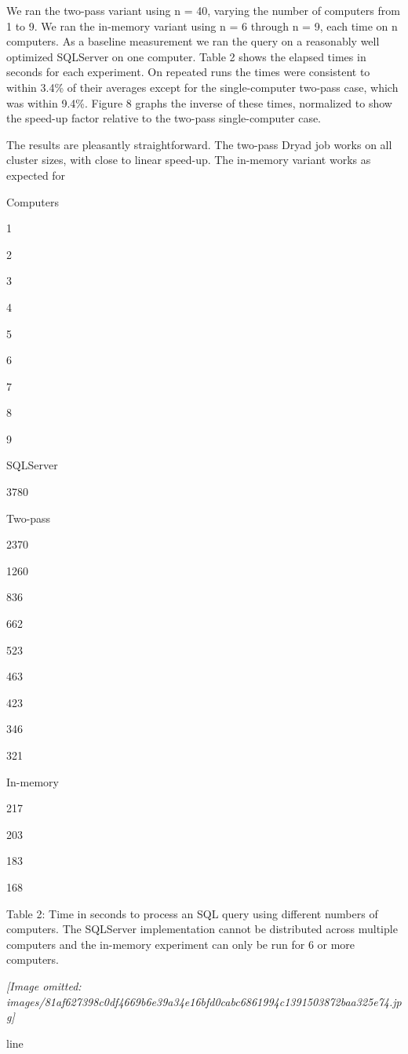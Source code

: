 \documentclass[
]{article}
\begin{document}
We ran the two-pass variant using n = 40, varying the number of
computers from 1 to 9. We ran the in-memory variant using n = 6 through
n = 9, each time on n computers. As a baseline measurement we ran the
query on a reasonably well optimized SQLServer on one computer. Table 2
shows the elapsed times in seconds for each experiment. On repeated runs
the times were consistent to within 3.4\% of their averages except for
the single-computer two-pass case, which was within 9.4\%. Figure 8
graphs the inverse of these times, normalized to show the speed-up
factor relative to the two-pass single-computer case.

The results are pleasantly straightforward. The two-pass Dryad job works
on all cluster sizes, with close to linear speed-up. The in-memory
variant works as expected for

Computers

1

2

3

4

5

6

7

8

9

SQLServer

3780

Two-pass

2370

1260

836

662

523

463

423

346

321

In-memory

217

203

183

168

Table 2: Time in seconds to process an SQL query using different numbers
of computers. The SQLServer implementation cannot be distributed across
multiple computers and the in-memory experiment can only be run for 6 or
more computers.

\textit{[Image omitted: images/81af627398c0df4669b6e39a34e16bfd0cabc6861994c1391503872baa325e74.jpg]}

line
\end{document}
